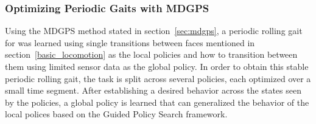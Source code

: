 

\subsubsection{Optimizing Periodic Gaits with MDGPS}
\label{sec:chains}

Using the MDGPS method stated in section~\ref{sec:mdgps}, a periodic rolling gait for \SB{} was learned using single transitions between faces mentioned in section~\ref{basic_locomotion} as the local policies and how to transition between them using limited sensor data as the global policy. 
In order to obtain this stable periodic rolling gait, the task is split across several policies, each optimized over a small time segment.
After establishing a desired behavior across the states seen by the policies, a global policy is learned that can generalized the behavior of the local polices based on the Guided Policy Search framework.

